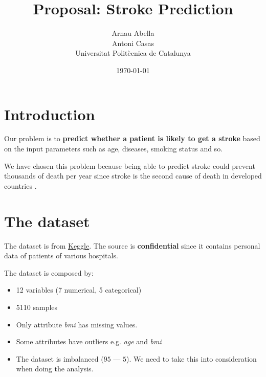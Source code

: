 \documentclass[12pt, a4paper]{article}
\title{%
  \vspace{-10ex}
  Proposal: Stroke Prediction
}
\author{%
  Arnau Abella \\
  Antoni Casas \\
  \large{Universitat Polit\`ecnica de Catalunya}
}
\date{\today}
\begin{document}
\maketitle

\vspace{5ex}

\section{Introduction}
\label{sec:introduction}

Our problem is to \textbf{predict whether a patient is likely to get a stroke} based on
the input parameters such as age, diseases, smoking status and so.

We have chosen this problem because being able to predict stroke could prevent thousands of death per year since stroke is the second  cause of death in developed countries \cite{who}.

\section{The dataset}
\label{sec:dataset}

The dataset is from \href{https://www.kaggle.com/fedesoriano/stroke-prediction-dataset}{Keggle}. The source is \textbf{confidential} since it contains personal data of patients of various hospitals.

The dataset is composed by:

\begin{itemize}
  \item 12 variables (7 numerical, 5 categorical)
  \item 5110 samples
  \item Only attribute \textit{bmi} has missing values.
  \item Some attributes have outliers e.g. \textit{age} and \textit{bmi}
  \item The dataset is imbalanced ($95$ --- $5$). We need to take this into consideration when doing the analysis.
\end{itemize}
\end{document}
